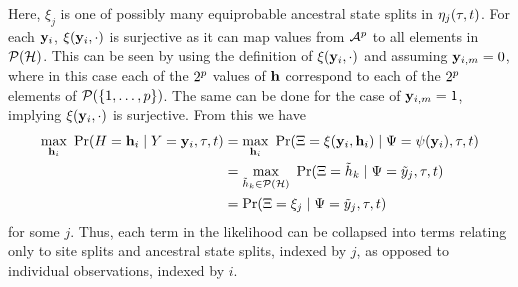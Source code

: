 Here, $\xi_j$ is one of possibly many equiprobable ancestral state splits in $\eta_j(\tau, t)$.
For each $\mathbf{y}_i$, $\xi(\mathbf{y}_i, \cdot)$ is surjective as it can map values from $\mathcal{A}^p$ to all elements in $\mathcal{P}(\mathcal{H})$.
This can be seen by using the definition of $\xi(\mathbf{y}_i, \cdot)$ and assuming $\mathbf{y}_{i,m}=0$, where in this case each of the $2^p$ values of $\mathbf{h}$ correspond to each of the $2^p$ elements of $\mathcal{P}(\{1,\ldots,p\})$.
The same can be done for the case of $\mathbf{y}_{i,m}=1$, implying $\xi(\mathbf{y}_i, \cdot)$ is surjective.
From this we have
\begin{align*}
    \max_{\ancestralStateColumn_i} \ \Pr(\ancestralStateColumnRV=\ancestralStateColumn_i \mid \alignmentColumnRV=\alignmentColumn_i, \tau, t) &= \max_{\ancestralStateColumn_i} \ \Pr(\ancestralSplitRV=\ancestralToSplit(\alignmentColumn_i, \ancestralStateColumn_i) \mid \siteSplitRV=\patternToSplit(\alignmentColumn_i), \tau, t)\\
    &= \max_{\ancestralSplit_k\in\mathcal{P}(\ancestralSplitSet)} \ \Pr(\ancestralSplitRV=\ancestralSplit_k \mid \siteSplitRV=\siteSplit_j, \tau, t)\\
    &= \Pr(\ancestralSplitRV = \xi_j \mid \siteSplitRV=\siteSplit_j, \tau, t)
\end{align*}
for some $j$.
Thus, each term in the likelihood can be collapsed into terms relating only to site splits and ancestral state splits, indexed by $j$, as opposed to individual observations, indexed by $i$.

